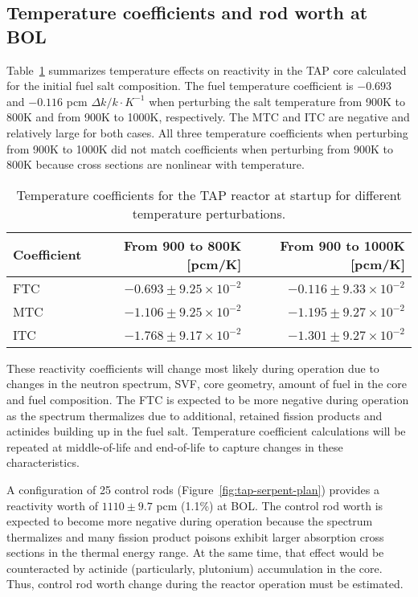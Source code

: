 \subsection{Temperature coefficients and rod worth at BOL}
Table~\ref{tab:tcoef} summarizes temperature effects on reactivity in the 
\gls{TAP} core calculated for the initial fuel salt composition. The fuel 
temperature coefficient is $-0.693$ and $-0.116$ pcm $\Delta k/k\cdot K^{-1}$ 
when perturbing the salt temperature from 900K to 800K and from 900K to 1000K, 
respectively. The MTC and ITC are negative and relatively large for both 
cases. All three temperature coefficients when perturbing from 900K to 
1000K did not match coefficients when perturbing from 900K to 800K because 
cross sections are nonlinear with temperature.

\begin{table}[ht!]
	\caption{Temperature coefficients for the \gls{TAP} reactor at startup for 
	different temperature perturbations.}
	\begin{tabularx}{\textwidth}{ X  r r } \hline
		\textbf{Coefficient} & \textbf{From 900 to 800K [pcm/K]} & 
		\textbf{From 900 to 1000K [pcm/K]}                  \tabularnewline 
		[5pt] \hline
		FTC & $-0.693\pm9.25\times10^{-2}$ & $-0.116\pm9.33\times10^{-2}$ 
		\tabularnewline [3pt] \hline
		MTC & $-1.106\pm9.25\times10^{-2}$ & $-1.195\pm9.27\times10^{-2}$  
		\tabularnewline [3pt] \hline
		ITC  & $-1.768\pm9.17\times10^{-2}$ &  $-1.301\pm9.27\times10^{-2}$  
		\tabularnewline [3pt] \hline
	\end{tabularx}
	\label{tab:tcoef}
\end{table}
These reactivity coefficients will change most likely during operation due to 
changes in the neutron spectrum, \gls{SVF}, core geometry, amount of fuel in 
the core and fuel composition. The FTC is expected to be more negative 
during operation as the spectrum thermalizes due to additional, retained  
fission products and actinides building up in the fuel salt. Temperature 
coefficient calculations will be repeated at middle-of-life and end-of-life 
to capture changes in these characteristics.

A configuration of 25 control rods (Figure~\ref{fig:tap-serpent-plan}) 
provides a reactivity worth of $1110\pm9.7$ pcm (1.1\%) at \gls{BOL}. The 
control rod worth is expected to become more negative during operation 
because the spectrum thermalizes and many fission product poisons exhibit 
larger absorption cross sections in the thermal energy range. At the same 
time, that effect would be counteracted by actinide (particularly, plutonium) 
accumulation in the core. Thus, control rod worth change during the reactor 
operation must be estimated.
